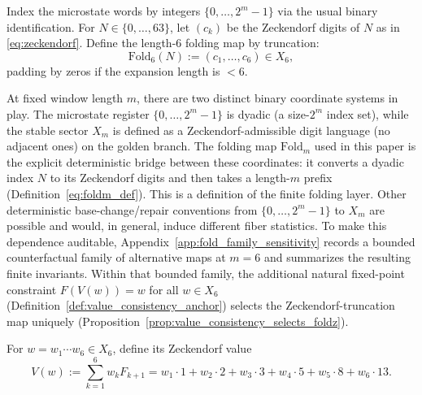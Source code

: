 Index the microstate words by integers $\{0,\dots,2^m-1\}$ via the usual binary identification.
For $N\in\{0,\dots,63\}$, let $(c_k)$ be the Zeckendorf digits of $N$ as in \eqref{eq:zeckendorf}.
Define the length-$6$ folding map by truncation:
\begin{equation}\label{eq:fold6_def}
\mathrm{Fold}_6(N):=(c_1,\dots,c_6)\in X_6,
\end{equation}
padding by zeros if the expansion length is $<6$.

\begin{remark}\label{rem:fold_dyadic_zeckendorf}
At fixed window length $m$, there are two distinct binary coordinate systems in play.
The microstate register $\{0,\dots,2^m-1\}$ is dyadic (a size-$2^m$ index set), while the stable sector $X_m$ is defined as a Zeckendorf-admissible digit language (no adjacent ones) on the golden branch.
The folding map $\mathrm{Fold}_m$ used in this paper is the explicit deterministic bridge between these coordinates: it converts a dyadic index $N$ to its Zeckendorf digits and then takes a length-$m$ prefix (Definition~\eqref{eq:foldm_def}).
This is a \MathTag definition of the finite folding layer.
Other deterministic base-change/repair conventions from $\{0,\dots,2^m-1\}$ to $X_m$ are possible and would, in general, induce different fiber statistics.
To make this dependence auditable, Appendix~\ref{app:fold_family_sensitivity} records a bounded counterfactual family of alternative maps at $m=6$ and summarizes the resulting finite invariants.
Within that bounded family, the additional natural fixed-point constraint $F(V(w))=w$ for all $w\in X_6$ (Definition~\ref{def:value_consistency_anchor}) selects the Zeckendorf-truncation map uniquely (Proposition~\ref{prop:value_consistency_selects_foldz}).
\end{remark}

\begin{definition}\label{def:zeckendorf_value}
For $w=w_1\cdots w_6\in X_6$, define its Zeckendorf value
\begin{equation}\label{eq:Vw_def}
V(w):=\sum_{k=1}^{6} w_k F_{k+1}
=w_1\cdot 1+w_2\cdot 2+w_3\cdot 3+w_4\cdot 5+w_5\cdot 8+w_6\cdot 13.
\end{equation}
\end{definition}

